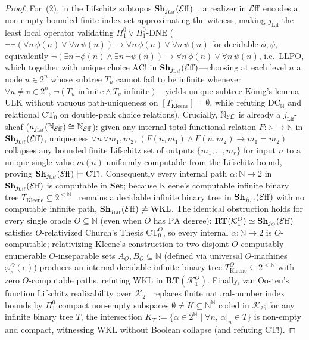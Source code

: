 \begin{proof}
For~(2), in the Lifschitz subtopos $\mathbf{Sh}_{j_{\mathrm{Lif}}}(\mathcal{E}\mathrm{ff})$~\cite[\S 4.4]{vanOosten08}, a realizer in $\mathcal{E}\mathrm{ff}$ encodes a non-empty bounded finite index set approximating the witness, making $j_{\mathrm{Lif}}$ the least local operator validating $\Pi^0_1 \lor \Pi^0_1\text{-}\mathrm{DNE}$ ($\neg\neg(\forall n\, \phi(n) \lor \forall n\, \psi(n)) \to \forall n\, \phi(n) \lor \forall n\, \psi(n)$ for decidable $\phi, \psi$, equivalently $\neg(\exists n\, \neg\phi(n) \wedge \exists n\, \neg\psi(n)) \to \forall n\, \phi(n) \lor \forall n\, \psi(n)$, i.e.\ $\mathrm{LLPO}$, which together with unique choice $\mathrm{AC}!$ in $\mathbf{Sh}_{j_{\mathrm{Lif}}}(\mathcal{E}\mathrm{ff})$---choosing at each level $n$ a node $u \in 2^n$ whose subtree $T_u$ cannot fail to be infinite whenever $\forall u \neq v \in 2^n,\, \neg(T_u\text{ infinite} \wedge T_v\text{ infinite})$---yields unique-subtree K\"onig's lemma $\mathrm{ULK}$ without vacuous path-uniqueness on $[T_{\mathrm{Kleene}}] = \emptyset$, while refuting $\mathrm{DC}_{\mathbb{N}}$ and relational $\mathrm{CT}_0$ on double-peak choice relations). Crucially, $\mathbb{N}_{\mathcal{E}\mathrm{ff}}$ is already a $j_{\mathrm{Lif}}$-sheaf ($a_{j_{\mathrm{Lif}}}(\mathbb{N}_{\mathcal{E}\mathrm{ff}}) \cong \mathbb{N}_{\mathcal{E}\mathrm{ff}}$): given any internal total functional relation $F : \mathbb{N} \to \mathbb{N}$ in $\mathbf{Sh}_{j_{\mathrm{Lif}}}(\mathcal{E}\mathrm{ff})$, uniqueness $\forall n\,\forall m_1, m_2,\, (F(n, m_1) \wedge F(n, m_2) \to m_1 = m_2)$ collapses any bounded finite Lifschitz set of outputs $\{m_1, \dots, m_r\}$ for input $n$ to a unique single value $m(n)$ uniformly computable from the Lifschitz bound, proving $\mathbf{Sh}_{j_{\mathrm{Lif}}}(\mathcal{E}\mathrm{ff}) \models \mathrm{CT}!$. Consequently every internal path $\alpha : \mathbb{N} \to 2$ in $\mathbf{Sh}_{j_{\mathrm{Lif}}}(\mathcal{E}\mathrm{ff})$ is computable in $\mathbf{Set}$; because Kleene's computable infinite binary tree $T_{\mathrm{Kleene}} \subseteq 2^{<\mathbb{N}}$~\cite{Kleene52} remains a decidable infinite binary tree in $\mathbf{Sh}_{j_{\mathrm{Lif}}}(\mathcal{E}\mathrm{ff})$ with no computable infinite path, $\mathbf{Sh}_{j_{\mathrm{Lif}}}(\mathcal{E}\mathrm{ff}) \not\models \mathrm{WKL}$. The identical obstruction holds for every single oracle $O \subseteq \mathbb{N}$ (even when $O$ has $\mathrm{PA}$ degree): $\mathbf{RT}(\mathcal{K}_1^O) \simeq \mathbf{Sh}_{j_O}(\mathcal{E}\mathrm{ff})$~\cite{LeeVanOosten13} satisfies $O$-relativized Church's Thesis $\mathrm{CT}_0^O$, so every internal $\alpha : \mathbb{N} \to 2$ is $O$-computable; relativizing Kleene's construction to two disjoint $O$-computably enumerable $O$-inseparable sets $A_O, B_O \subseteq \mathbb{N}$ (defined via universal $O$-machines $\varphi_e^O(e)$) produces an internal decidable infinite binary tree $T_{\mathrm{Kleene}}^O \subseteq 2^{<\mathbb{N}}$ with zero $O$-computable paths, refuting $\mathrm{WKL}$ in $\mathbf{RT}(\mathcal{K}_1^O)$. Finally, van Oosten's function Lifschitz realizability over $\mathcal{K}_2$~\cite[\S 3]{vanOosten90} replaces finite natural-number index bounds by $\Pi^0_1$ compact non-empty subspaces $\emptyset \neq K \subseteq \mathbb{N}^{\mathbb{N}}$ coded in $\mathcal{K}_2$; for any infinite binary tree $T$, the intersection $K_T := \{ \alpha \in 2^{\mathbb{N}} \mid \forall n,\, \alpha|_n \in T \}$ is non-empty and compact, witnessing $\mathrm{WKL}$ without Boolean collapse (and refuting $\mathrm{CT}!$).

\end{proof}

